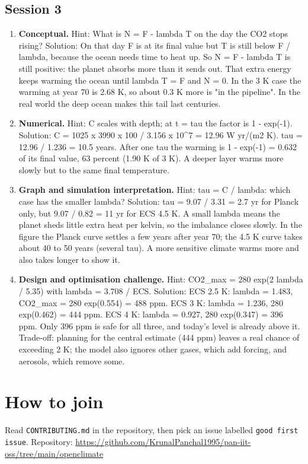 \documentclass[11pt,a4paper]{article}
\begin{document}
\subsection*{Session 3}
\begin{enumerate}[nosep]
\item \textbf{Conceptual.} Hint: What is N = F - lambda T on the day the CO2 stops rising? Solution: On that day F is at its final value but T is still below F / lambda, because the ocean needs time to heat up. So N = F - lambda T is still positive: the planet absorbs more than it sends out. That extra energy keeps warming the ocean until lambda T = F and N = 0. In the 3 K case the warming at year 70 is 2.68 K, so about 0.3 K more is "in the pipeline". In the real world the deep ocean makes this tail last centuries.
\item \textbf{Numerical.} Hint: C scales with depth; at t = tau the factor is 1 - exp(-1). Solution: C = 1025 x 3990 x 100 / 3.156 x 10\textasciicircum{}7 = 12.96 W yr/(m2 K). tau = 12.96 / 1.236 = 10.5 years. After one tau the warming is 1 - exp(-1) = 0.632 of its final value, 63 percent (1.90 K of 3 K). A deeper layer warms more slowly but to the same final temperature.
\item \textbf{Graph and simulation interpretation.} Hint: tau = C / lambda: which case has the smaller lambda? Solution: tau = 9.07 / 3.31 = 2.7 yr for Planck only, but 9.07 / 0.82 = 11 yr for ECS 4.5 K. A small lambda means the planet sheds little extra heat per kelvin, so the imbalance closes slowly. In the figure the Planck curve settles a few years after year 70; the 4.5 K curve takes about 40 to 50 years (several tau). A more sensitive climate warms more and also takes longer to show it.
\item \textbf{Design and optimisation challenge.} Hint: CO2\_max = 280 exp(2 lambda / 5.35) with lambda = 3.708 / ECS. Solution: ECS 2.5 K: lambda = 1.483, CO2\_max = 280 exp(0.554) = 488 ppm. ECS 3 K: lambda = 1.236, 280 exp(0.462) = 444 ppm. ECS 4 K: lambda = 0.927, 280 exp(0.347) = 396 ppm. Only 396 ppm is safe for all three, and today's level is already above it. Trade-off: planning for the central estimate (444 ppm) leaves a real chance of exceeding 2 K; the model also ignores other gases, which add forcing, and aerosols, which remove some.
\end{enumerate}

\section{How to join}
Read \texttt{CONTRIBUTING.md} in the repository, then pick an issue labelled \texttt{good first issue}. Repository: \url{https://github.com/KrunalPanchal1995/pan-iit-oss/tree/main/openclimate}
\end{document}
